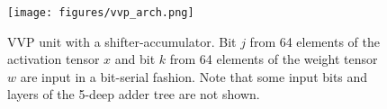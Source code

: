 \documentclass[sigconf]{acmart}
\newcommand{\MVU}{MVU}
\newcommand{\sean}[1]{{\color{blue} #1}}
\begin{document}


\begin{figure}[t]
    \hspace*{-1.3cm}  
      \centering
        \texttt{[image: figures/vvp\_arch.png]}
        \small
    \caption{VVP unit with a shifter-accumulator. Bit $j$ from 64 elements of the activation tensor $x$ and bit $k$ from 64 elements of the weight tensor $w$ are input in a bit-serial fashion. Note that some input bits and layers of the 5-deep adder tree are not shown.}
    \label{fig:vvp_arch}
    \vspace{-4mm}
\end{figure}
\end{document}
